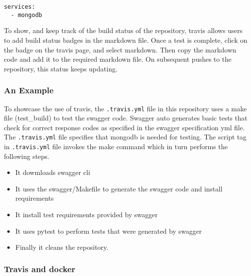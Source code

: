 \begin{lstlisting}
services:
  - mongodb
\end{lstlisting}

To show, and keep track of the build status of the repository, travis
allows users to add build status badges in the markdown file. Once a
test is complete, click on the badge on the travis page, and select
markdown. Then copy the markdown code and add it to the required
markdown file. On subsequent pushes to the repository, this status keeps
updating.

\subsubsection{An Example}


To showcase the use of travis, the \texttt{.travis.yml} file in this
repository uses a make file (test\_build) to test the swagger code.
Swagger auto generates basic tests that check for correct response codes
as specified in the swagger specification yml file. The
\texttt{.travis.yml} file specifies that mongodb is needed for testing.
The script tag in \texttt{.travis.yml} file invokes the make command
which in turn performs the following steps.

\begin{itemize}
\item
  It dowmloads swagger cli
\item
  It uses the swagger/Makefile to generate the swagger code and install
  requirements
\item
  It install test requirements provided by swagger
\item
  It uses pytest to perform tests that were generated by swagger
\item
  Finally it cleans the repository.
\end{itemize}

\subsubsection{Travis and docker}


